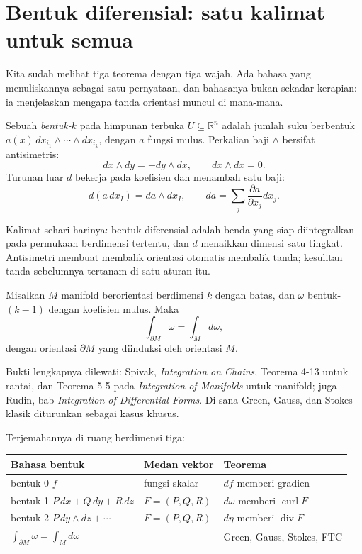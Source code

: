 \section{Bentuk diferensial: satu kalimat untuk semua}

Kita sudah melihat tiga teorema dengan tiga wajah. Ada bahasa yang
menuliskannya sebagai satu pernyataan, dan bahasanya bukan sekadar kerapian: ia
menjelaskan mengapa tanda orientasi muncul di mana-mana.

\begin{definisi}
 Sebuah \emph{bentuk-$k$} pada himpunan terbuka
$U\subseteq\mathbb{R}^{n}$ adalah jumlah suku berbentuk
$a(x)\,dx_{i_{1}}\wedge\cdots\wedge dx_{i_{k}}$, dengan $a$ fungsi mulus.
Perkalian baji $\wedge$ bersifat antisimetris:
\[
dx\wedge dy=-dy\wedge dx,\qquad dx\wedge dx=0 .
\]
Turunan luar $d$ bekerja pada koefisien dan menambah satu baji:
\[
d(a\,dx_{I})=da\wedge dx_{I},\qquad da=\sum_{j}\frac{\partial a}{\partial x_{j}}dx_{j}.
\]
\end{definisi}

Kalimat sehari-harinya: bentuk diferensial adalah benda yang siap
diintegralkan pada permukaan berdimensi tertentu, dan $d$ menaikkan dimensi satu
tingkat. Antisimetri membuat membalik orientasi otomatis membalik tanda;
kesulitan tanda sebelumnya tertanam di satu aturan itu.

\begin{teorema}
Misalkan $M$ manifold berorientasi berdimensi $k$ dengan batas, dan $\omega$
bentuk-$(k-1)$ dengan koefisien mulus. Maka
\[
\int_{\partial M}\omega=\int_{M}d\omega ,
\]
dengan orientasi $\partial M$ yang diinduksi oleh orientasi $M$.
\end{teorema}

Bukti lengkapnya dilewati: Spivak, \emph{Integration on Chains}, Teorema 4-13
untuk rantai, dan Teorema 5-5 pada \emph{Integration of Manifolds} untuk
manifold; juga Rudin, bab \emph{Integration of Differential Forms}. Di sana
Green, Gauss, dan Stokes klasik diturunkan sebagai kasus khusus.

Terjemahannya di ruang berdimensi tiga:

\begin{center}
\begin{tabular}{lll}
\hline
Bahasa bentuk & Medan vektor & Teorema \\
\hline
bentuk-0 $f$ & fungsi skalar & $df$ memberi gradien \\
bentuk-1 $P\,dx+Q\,dy+R\,dz$ & $F=(P,Q,R)$ & $d\omega$ memberi $\operatorname{curl}F$ \\
bentuk-2 $P\,dy\wedge dz+\cdots$ & $F=(P,Q,R)$ & $d\eta$ memberi $\operatorname{div}F$ \\
$\int_{\partial M}\omega=\int_{M}d\omega$ & & Green, Gauss, Stokes, FTC \\
\hline
\end{tabular}
\end{center}

